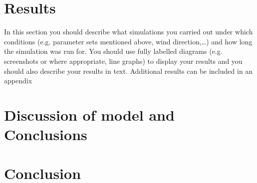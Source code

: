 \documentclass[11pt, a4paper, titlepage]{article}
\begin{document}
\section{Results}
\begin{displayquote}
  In this section you should describe what simulations you
carried out under which conditions (e.g. parameter sets mentioned above, wind direction,…) and
how long the simulation was run for. You should use fully labelled diagrams (e.g. screenshots or
where appropriate, line graphs) to display your results and you should also describe your results in
text. Additional results can be included in an appendix
\end{displayquote}

\newpage
\section{Discussion of model and Conclusions} 
\section{Conclusion}

\newpage
\renewcommand{\bibname}{Bibliography}


\end{document}
